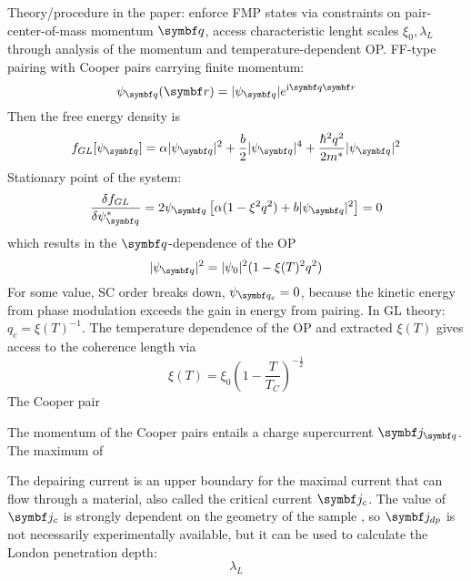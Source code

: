 \documentclass[../notes.tex]{subfiles}
\begin{document}
Theory/procedure in the paper: enforce FMP states via constraints on pair-center-of-mass momentum \(\vb{q}\), access characteristic lenght scales \(\xi_0, \lambda_L\) through analysis of the momentum and temperature-dependent OP\@.
FF-type pairing with Cooper pairs carrying finite momentum:
\begin{equation}
	\psi_{\vb{q}} (\vb{r}) = \vert \psi_{\vb{q}} \vert e^{\iu \vb{q} \vb{r}}
\end{equation}
Then the free energy density is
\begin{equation}
	f_{GL} [\psi_{\vb{q}}] = \alpha \vert \psi_{\vb{q}} \vert^2 + \frac{b}{2} \vert \psi_{\vb{q}} \vert^4 + \frac{\hbar^2 q^2}{2 m^*} \vert \psi_{\vb{q}} \vert^2
\end{equation}
Stationary point of the system:
\begin{equation}
	\fdv{f_{GL}}{\psi_{\vb{q}}^*} = 2 \psi_{\vb{q}} \left[\alpha (1 - \xi^2 q^2) + b \vert \psi_{\vb{q}} \vert^2\right] = 0
\end{equation}
which results in the \(\vb{q}\)-dependence of the OP
\begin{equation}
	\vert \psi_{\vb{q}} \vert^2 = \vert \psi_{0} \vert^2 (1 - \xi(T)^2 q^2)
\end{equation}
For some value, SC order breaks down, \(\psi_{\vb{q}_c} = 0\), because the kinetic energy from phase modulation exceeds the gain in energy from pairing.
In GL theory: \(q_c = \xi(T)^{-1}\).
The temperature dependence of the OP and extracted \(\xi(T)\) gives access to the coherence length via
\begin{equation}
	\xi(T) = \xi_0 (1 - \frac{T}{T_C})^{-\frac{1}{2}}
\end{equation}
The Cooper pair


The momentum of the Cooper pairs entails a charge supercurrent \(\vb{j}_{\vb{q}}\).
The maximum of 

The depairing current is an upper boundary for the maximal current that can flow through a material, also called the critical current \(\vb{j}_c\).
The value of \(\vb{j}_c\) is strongly dependent on the geometry of the sample \cite{bardeenCriticalFieldsCurrents1962, xuAchievingTheoreticalDepairing2010}, so \(\vb{j}_{dp}\) is not necessarily experimentally available, but it can be used to calculate the London penetration depth:
\begin{equation}
	\lambda_L
\end{equation}
\end{document}

